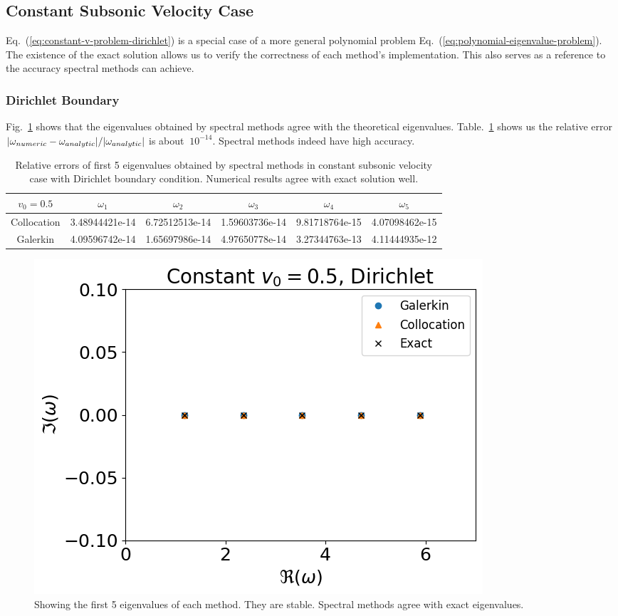\subsection{Constant Subsonic Velocity Case}
Eq.~(\ref{eq:constant-v-problem-dirichlet}) is a special case of a more general polynomial problem Eq.~(\ref{eq:polynomial-eigenvalue-problem}). The existence of the exact solution allows us to verify the correctness of each method's implementation. This also serves as a reference to the accuracy spectral methods can achieve.

\subsubsection*{Dirichlet Boundary}
Fig.~\ref{fig:constant-subsonic-dirichlet} shows that the eigenvalues obtained by spectral methods agree with the theoretical eigenvalues. Table.~\ref{table:eigenvalue-error-constant-subsonic-dirichlet} shows us the relative error $\abs{\omega_{numeric} - \omega_{analytic}}/\abs{\omega_{analytic}}$ is about $~10^{-14}$. Spectral methods indeed have high accuracy.

\begin{table} [H]
	\centering
	\caption{Relative errors of first 5 eigenvalues obtained by spectral methods in constant subsonic velocity case with Dirichlet boundary condition. Numerical results agree with exact solution well.}
	\begin{tabular}{|c|c|c|c|c|c|}
		\hline
		$v_0=0.5$   & $\omega_1$     & $\omega_2$     & $\omega_3$     & $\omega_4$     & $\omega_5$     \\
		\hline
		Collocation & 3.48944421e-14 & 6.72512513e-14 & 1.59603736e-14 & 9.81718764e-15 & 4.07098462e-15 \\
		\hline
		Galerkin    & 4.09596742e-14 & 1.65697986e-14 & 4.97650778e-14 & 3.27344763e-13 & 4.11444935e-12 \\
		\hline
	\end{tabular}
	\label{table:eigenvalue-error-constant-subsonic-dirichlet}
\end{table}

\begin{figure}[H]
	\centering
	\includegraphics[width=0.7\linewidth]{figures/constant-subsonic-dirichlet.png}
	\caption{Showing the first 5 eigenvalues of each method. They are stable. Spectral methods agree with exact eigenvalues.}
	\label{fig:constant-subsonic-dirichlet}
\end{figure}



